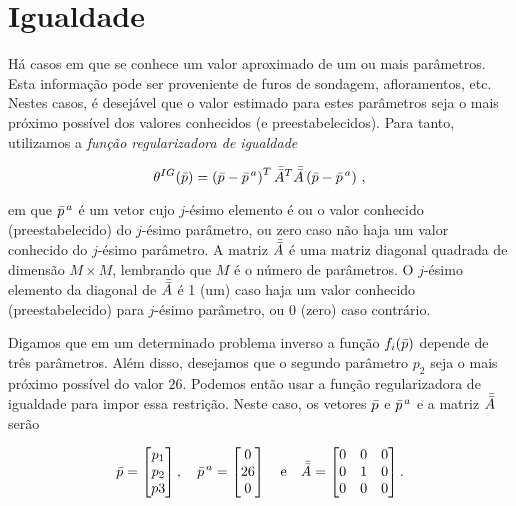 \section{Igualdade}

Há casos em que se conhece um valor aproximado de um ou mais parâmetros.
Esta informação pode ser proveniente de furos de sondagem, afloramentos, etc.
Nestes casos, é desejável que o valor estimado para estes parâmetros seja o mais
próximo possível dos valores conhecidos (e preestabelecidos).
Para tanto, utilizamos a {\it função regularizadora de igualdade}

\begin{equation}
\theta^{IG}(\bar{p}) =
    \left(\bar{p} - \bar{p}^{\thinspace a}\right)^T \bar{\bar{A}}^T\bar{\bar{A}}
        \left(\bar{p} - \bar{p}^{\thinspace a} \right)
    \thinspace ,
\label{eq:igualdade}
\end{equation}

\noindent em que $\bar{p}^{\thinspace a}$ é um vetor cujo $j$-ésimo elemento é
ou o valor conhecido (preestabelecido) do $j$-ésimo parâmetro, ou zero caso não
haja um valor conhecido do $j$-ésimo parâmetro. A matriz $\bar{\bar{A}}$ é uma matriz
diagonal quadrada de dimensão $M \times M$, lembrando que $M$ é o número de
parâmetros.
O $j$-ésimo elemento da diagonal de $\bar{\bar{A}}$ é 1 (um) caso
haja um valor conhecido (preestabelecido) para $j$-ésimo parâmetro, ou 0 (zero)
caso contrário.

\begin{example}
Digamos que em um determinado problema inverso a função
$f_i(\bar{p})$ depende de três parâmetros. Além disso, desejamos que o segundo
parâmetro $p_2$ seja o mais próximo possível do valor $26$.
Podemos então usar a função regularizadora de igualdade para impor essa restrição.
Neste caso, os vetores $\bar{p}$ e $\bar{p}^{\thinspace a}$ e a matriz
$\bar{\bar{A}}$ serão

\[
\bar{p} =
    \begin{bmatrix}
    p_1 \\ p_2 \\ p3
    \end{bmatrix} , \quad
\bar{p}^{\thinspace a} =
    \begin{bmatrix}
    0 \\ 26 \\ 0
    \end{bmatrix} \quad \text{e} \quad
\bar{\bar{A}} = 
    \begin{bmatrix}
    0 & 0 & 0 \\
    0 & 1 & 0 \\
    0 & 0 & 0
    \end{bmatrix} .
\]
\end{example}

